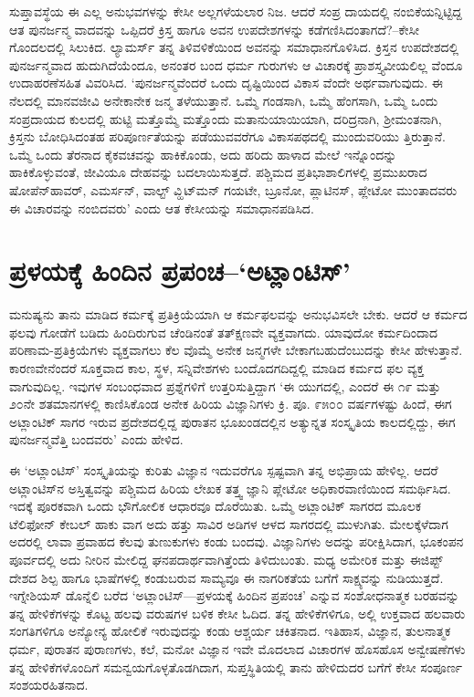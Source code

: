 ಸುಪ್ತಾವಸ್ಥೆಯ ಈ ಎಲ್ಲ ಅನುಭವಗಳನ್ನು ಕೇಸೀ ಅಲ್ಲಗಳೆಯಲಾರ ನಿಜ. ಆದರೆ ಸಂಪ್ರ ದಾಯದಲ್ಲಿ ನಂಬಿಕೆಯನ್ನಿಟ್ಟಿದ್ದ ಆತ ಪುನರ್ಜನ್ಮ ವಾದವನ್ನು ಒಪ್ಪಿದರೆ ಕ್ರಿಸ್ತ ಹಾಗೂ ಅವನ ಉಪದೇಶಗಳನ್ನು ಕಡೆಗಣಿಸಿದಂತಾಗದೆ?–ಕೇಸೀ ಗೊಂದಲದಲ್ಲಿ ಸಿಲುಕಿದ. ಲ್ಯಾಮರ್ಸ್ ತನ್ನ ತಿಳಿವಳಿಕೆಯಿಂದ ಅವನನ್ನು ಸಮಾಧಾನಗೊಳಿಸಿದ. ಕ್ರಿಸ್ತನ ಉಪದೇಶದಲ್ಲಿ ಪುನರ್ಜನ್ಮವಾದ ಹುದುಗಿದೆಯೆಂದೂ, ಅನಂತರ ಬಂದ ಧರ್ಮ ಗುರುಗಳು ಆ ವಿಚಾರಕ್ಕೆ ಪ್ರಾಶಸ್ತ್ಯವೀಯಲಿಲ್ಲ ವೆಂದೂ ಉದಾಹರಣೆಸಹಿತ ವಿವರಿಸಿದ. ‘ಪುನರ್ಜನ್ಮವೆಂದರೆ ಒಂದು ದೃಷ್ಟಿಯಿಂದ ವಿಕಾಸ ವೆಂದೇ ಅರ್ಥವಾಗುವುದು. ಈ ನೆಲದಲ್ಲಿ ಮಾನವಜೀವಿ ಅನೇಕಾನೇಕ ಜನ್ಮ ತಳೆಯುತ್ತಾನೆ. ಒಮ್ಮೆ ಗಂಡಸಾಗಿ, ಒಮ್ಮೆ ಹೆಂಗಸಾಗಿ, ಒಮ್ಮೆ ಒಂದು ಸಂಪ್ರದಾಯದ ಕುಲದಲ್ಲಿ ಹುಟ್ಟಿ ಮತ್ತೊಮ್ಮೆ ಮತ್ತೊಂದು ಮತಾನುಯಾಯಿಯಾಗಿ, ದರಿದ್ರನಾಗಿ, ಶ‍್ರೀಮಂತನಾಗಿ, ಕ್ರಿಸ್ತನು ಬೋಧಿಸಿದಂತಹ ಪರಿಪೂರ್ಣತೆಯನ್ನು ಪಡೆಯುವವರೆಗೂ ವಿಕಾಸಪಥದಲ್ಲಿ ಮುಂದುವರಿಯು ತ್ತಿರುತ್ತಾನೆ. ಒಮ್ಮೆ ಒಂದು ತೆರನಾದ ಕೈಕವಚವನ್ನು ಹಾಕಿಕೊಂಡು, ಅದು ಹರಿದು ಹಾಳಾದ ಮೇಲೆ ಇನ್ನೊಂದನ್ನು ಹಾಕಿಕೊಳ್ಳುವಂತೆ, ಜೀವಿಯೂ ದೇಹವನ್ನು ಬದಲಾಯಿಸುತ್ತದೆ. ಪಶ್ಚಿಮದ ಪ್ರತಿಭಾಶಾಲಿಗಳಲ್ಲಿ ಪ್ರಮುಖರಾದ ಷೋಪೆನ್​ಹಾವರ್, ಎಮರ್ಸನ್, ವಾಲ್ಟ್ ವ್ಹಿಟ್​ಮನ್ ಗಯಟೇ, ಬ್ರೂನೋ, ಪ್ಲಾಟಿನಸ್, ಪ್ಲೇಟೋ ಮುಂತಾದವರು ಈ ವಿಚಾರವನ್ನು ನಂಬಿದವರು’ ಎಂದು ಆತ ಕೇಸೀಯನ್ನು ಸಮಾಧಾನಪಡಿಸಿದ.


\section{ಪ್ರಳಯಕ್ಕೆ ಹಿಂದಿನ ಪ್ರಪಂಚ–‘ಅಟ್ಲಾಂಟಿಸ್​'}

ಮನುಷ್ಯನು ತಾನು ಮಾಡಿದ ಕರ್ಮಕ್ಕೆ ಪ್ರತಿಕ್ರಿಯೆಯಾಗಿ ಆ ಕರ್ಮಫಲವನ್ನು ಅನುಭವಿಸಲೇ ಬೇಕು. ಆದರೆ ಆ ಕರ್ಮದ ಫಲವು ಗೋಡೆಗೆ ಬಡಿದು ಹಿಂದಿರುಗುವ ಚೆಂಡಿನಂತೆ ತತ್​ಕ್ಷಣವೇ ವ್ಯಕ್ತವಾಗದು. ಯಾವುದೋ ಕರ್ಮದಿಂದಾದ ಪರಿಣಾಮ-ಪ್ರತಿಕ್ರಿಯೆಗಳು ವ್ಯಕ್ತವಾಗಲು ಕೆಲ ವೊಮ್ಮೆ ಅನೇಕ ಜನ್ಮಗಳೇ ಬೇಕಾಗಬಹುದೆಂಬುದನ್ನು ಕೇಸೀ ಹೇಳುತ್ತಾನೆ. ಕಾರಣವೇನೆಂದರೆ ಸೂಕ್ತವಾದ ಕಾಲ, ಸ್ಥಳ, ಸನ್ನಿವೇಶಗಳು ಬಂದೊದಗದಿದ್ದಲ್ಲಿ ಮಾಡಿದ ಕರ್ಮದ ಫಲ ವ್ಯಕ್ತ ವಾಗುವುದಿಲ್ಲ. ಇವುಗಳ ಸಂಬಂಧವಾದ ಪ್ರಶ್ನೆಗಳಿಗೆ ಉತ್ತರಿಸುತ್ತಿದ್ದಾಗ ‘ಈ ಯುಗದಲ್ಲಿ, ಎಂದರೆ ಈ ೧೯ ಮತ್ತು ೨೦ನೇ ಶತಮಾನಗಳಲ್ಲಿ ಕಾಣಿಸಿಕೊಂಡ ಅನೇಕ ಹಿರಿಯ ವಿಜ್ಞಾನಿಗಳು ಕ್ರಿ. ಪೂ. ೯೫೦೦ ವರ್ಷಗಳಷ್ಟು ಹಿಂದೆ, ಈಗ ಅಟ್ಲಾಂಟಿಕ್ ಸಾಗರ ಇರುವ ಪ್ರದೇಶದಲ್ಲಿದ್ದ ಪುರಾತನ ಭೂಖಂಡದಲ್ಲಿನ ಅತ್ಯುನ್ನತ ಸಂಸ್ಕೃತಿಯ ಕಾಲದಲ್ಲಿದ್ದು, ಈಗ ಪುನರ್ಜನ್ಮವೆತ್ತಿ ಬಂದವರು’ ಎಂದು ಹೇಳಿದ.

ಈ ‘ಅಟ್ಲಾಂಟಿಸ್​’ ಸಂಸ್ಕೃತಿಯನ್ನು ಕುರಿತು ವಿಜ್ಞಾನ ಇದುವರೆಗೂ ಸ್ಪಷ್ಟವಾಗಿ ತನ್ನ ಅಭಿಪ್ರಾಯ ಹೇಳಿಲ್ಲ. ಆದರೆ ಅಟ್ಲಾಂಟಿಸ್​ನ ಅಸ್ತಿತ್ವವನ್ನು ಪಶ್ಚಿಮದ ಹಿರಿಯ ಲೇಖಕ ತತ್ತ್ವ ಜ್ಞಾನಿ ಪ್ಲೇಟೋ ಅಧಿಕಾರವಾಣಿಯಿಂದ ಸಮರ್ಥಿಸಿದ. ಇದಕ್ಕೆ ಪೂರಕವಾಗಿ ಒಂದು ಭೌಗೋಲಿಕ ಆಧಾರವೂ ದೊರೆಯಿತು. ಒಮ್ಮೆ ಅಟ್ಲಾಂಟಿಕ್ ಸಾಗರದ ಮೂಲಕ ಟೆಲಿಫೋನ್ ಕೇಬಲ್ ಹಾಕು ವಾಗ ಅದು ಹತ್ತು ಸಾವಿರ ಅಡಿಗಳ ಆಳದ ಸಾಗರದಲ್ಲಿ ಮುಳುಗಿತು. ಮೇಲಕ್ಕೆಳೆದಾಗ ಅದರಲ್ಲಿ ಲಾವಾ ಪ್ರವಾಹದ ಕೆಲವು ತುಣುಕುಗಳು ಕಂಡು ಬಂದವು. ವಿಜ್ಞಾನಿಗಳು ಅದನ್ನು ಪರೀಕ್ಷಿಸಿದಾಗ, ಭೂಕಂಪನ ಪೂರ್ವದಲ್ಲಿ ಅದು ನೀರಿನ ಮೇಲಿದ್ದ ಘನಪದಾರ್ಥವಾಗಿತ್ತೆಂದು ತಿಳಿದುಬಂತು. ಮಧ್ಯ ಅಮೇರಿಕ ಮತ್ತು ಈಜಿಪ್ಟ್ ದೇಶದ ಶಿಲ್ಪ ಹಾಗೂ ಭಾಷೆಗಳಲ್ಲಿ ಕಂಡುಬರುವ ಸಾಮ್ಯವೂ ಈ ನಾಗರಿಕತೆಯ ಬಗೆಗೆ ಸಾಕ್ಷ್ಯವನ್ನು ನುಡಿಯುತ್ತದೆ. ಇಗ್ನೇಶಿಯಸ್ ಡೊನ್ನೆಲಿ ಬರೆದ ‘ಅಟ್ಲಾಂಟಿಸ್​—ಪ್ರಳಯಕ್ಕೆ ಹಿಂದಿನ ಪ್ರಪಂಚ’ ಎನ್ನುವ ಸಂಶೋಧನಾತ್ಮಕ ಬರಹವನ್ನು ತನ್ನ ಹೇಳಿಕೆಗಳನ್ನು ಕೊಟ್ಟ ಹಲವು ವರುಷಗಳ ಬಳಿಕ ಕೇಸೀ ಓದಿದ. ತನ್ನ ಹೇಳಿಕೆಗಳಿಗೂ, ಅಲ್ಲಿ ಉಕ್ತವಾದ ಹಲವಾರು ಸಂಗತಿಗಳಿಗೂ ಅನ್ಯೋನ್ಯ ಹೋಲಿಕೆ ಇರುವುದನ್ನು ಕಂಡು ಆಶ್ಚರ್ಯ ಚಕಿತನಾದ. ಇತಿಹಾಸ, ವಿಜ್ಞಾನ, ತುಲನಾತ್ಮಕ ಧರ್ಮ, ಪುರಾತನ ಪುರಾಣಗಳು, ಕಲೆ, ಮನೋ ವಿಜ್ಞಾನ ಇವೇ ಮೊದಲಾದ ವಿಚಾರಗಳ ಹೊಸಹೊಸ ಅನ್ವೇಷಣೆಗಳು ತನ್ನ ಹೇಳಿಕೆಗಳೊಂದಿಗೆ ಸಮನ್ವಯಗೊಳ್ಳತೊಡಗಿದಾಗ, ಸುಪ್ತಸ್ಥಿತಿಯಲ್ಲಿ ತಾನು ಹೇಳಿದುದರ ಬಗೆಗೆ ಕೇಸೀ ಸಂಪೂರ್ಣ ಸಂಶಯರಹಿತನಾದ.

